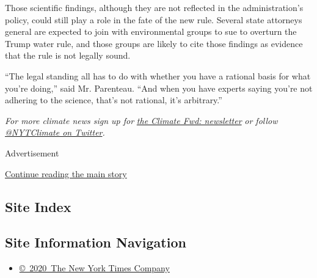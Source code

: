 Those scientific findings, although they are not reflected in the
administration's policy, could still play a role in the fate of the new
rule. Several state attorneys general are expected to join with
environmental groups to sue to overturn the Trump water rule, and those
groups are likely to cite those findings as evidence that the rule is
not legally sound.

``The legal standing all has to do with whether you have a rational
basis for what you're doing,'' said Mr. Parenteau. ``And when you have
experts saying you're not adhering to the science, that's not rational,
it's arbitrary.''

\emph{For more climate news sign up for}
\href{https://www.nytimes3xbfgragh.onion/newsletters/climate-change}{\emph{the
Climate Fwd: newsletter}} \emph{or follow}
\href{https://twitter.com/nytclimate}{\emph{@NYTClimate on
Twitter}}\emph{.}

Advertisement

\protect\hyperlink{after-bottom}{Continue reading the main story}

\hypertarget{site-index}{%
\subsection{Site Index}\label{site-index}}

\hypertarget{site-information-navigation}{%
\subsection{Site Information
Navigation}\label{site-information-navigation}}

\begin{itemize}
\tightlist
\item
  \href{https://help.nytimes3xbfgragh.onion/hc/en-us/articles/115014792127-Copyright-notice}{©~2020~The
  New York Times Company}
\end{itemize}

